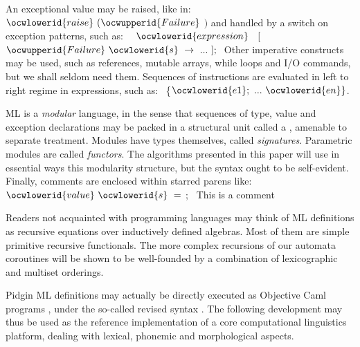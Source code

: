 \documentclass[12pt]{article}
\begin{document}
\ocwendcode{}\ocwindent{0.00em}
An exceptional value may be raised, like in:
\ocwbegindcode{}$\ocwlowerid{raise}~(\ocwupperid{Failure}~$$)$\ocwenddcode{} and handled by a \ocwbegindcode{}\ocwenddcode{} switch on
exception patterns, such as: 
\ocweol
\ocwindent{0.00em}
\ocwbegindcode{}~~$\ocwlowerid{expression}~$~[~$\ocwupperid{Failure}~\ocwlowerid{s}~\rightarrow{}~...~];~$\ocwenddcode{} 
\ocweol
\ocwindent{0.00em}
Other imperative constructs may be used, such as 
references, mutable arrays, while loops and I/O commands,
but we shall seldom need them.
Sequences of instructions are
evaluated in left to right regime in \ocwbegindcode{}\ocwenddcode{} expressions, such as:
\ocwbegindcode{}~\{$\ocwlowerid{e1};~...~\ocwlowerid{en}\}$\ocwenddcode{}. 

ML is a {\sl modular} language,
in the sense that sequences of type, value
and exception declarations may be packed in a structural unit called a
\ocwbegindcode{}\ocwenddcode{}, amenable to separate treatment. 
Modules have types themselves, called {\sl signatures}. Parametric
modules are called {\sl functors}. The algorithms presented in this paper
will use in essential ways 
this modularity structure, but the syntax ought to be self-evident.
Finally, comments are enclosed within starred parens like: 
\ocweol
\label{../ML/pidgin.ml:4208}%
\medskip
\ocwbegincode{}\ocwindent{0.00em}
$\ocwlowerid{value}~\ocwlowerid{s}~=~$;~\ocwbc{} This is a comment \ocwec{}\medskip

\ocwendcode{}\ocwindent{0.00em}
Readers not acquainted with programming languages may think of ML
definitions as recursive
equations over inductively defined algebras. Most of them are simple
primitive recursive functionals. The more complex recursions of our
automata coroutines will be shown to be well-founded by 
a combination of lexicographic and multiset orderings.

Pidgin ML definitions may actually be directly executed as 
Objective Caml programs \cite{ocaml},
under the so-called revised syntax \cite{camlp4}. 
The following development may thus 
be used as the reference implementation of a core
computational linguistics platform, dealing with lexical, phonemic and
morphological aspects. 
\end{document}
